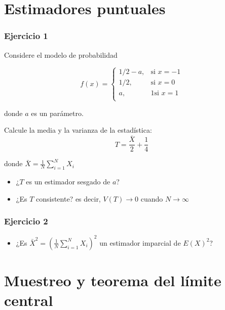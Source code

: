 \documentclass[
]{book}
\providecommand{\tightlist}{%
  \setlength{\itemsep}{0pt}\setlength{\parskip}{0pt}}
\begin{document}
\hypertarget{estimadores-puntuales}{%
\section{Estimadores puntuales}\label{estimadores-puntuales}}

\hypertarget{ejercicio-1-5}{%
\subsubsection{Ejercicio 1}\label{ejercicio-1-5}}

Considere el modelo de probabilidad

\[
    f(x)= 
\begin{cases}
    1/2-a,& \text{si } x=-1 \\ 
    1/2,& \text{si } x=0\\
    a,& 1 \text{si } x=1\\ 
\end{cases}
\]

donde \(a\) es un parámetro.

Calcule la media y la varianza de la estadística: \[T=\frac{\bar{X}}{2}+\frac{1}{4}\]

donde \(\bar{X}=\frac{1}{N}\sum_{i=1}^N X_i\)

\begin{itemize}
\item
  ¿\(T\) es un estimador sesgado de \(a\)?
\item
  ¿Es \(T\) consistente? es decir, \(V(T) \rightarrow 0\) cuando \(N\rightarrow \infty\)
\end{itemize}

\hypertarget{ejercicio-2-5}{%
\subsubsection{Ejercicio 2}\label{ejercicio-2-5}}

\begin{itemize}
\tightlist
\item
  ¿Es \(\bar{X}^2=(\frac{1}{N}\sum_{i=1}^N X_i)^2\) un estimador imparcial de \(E(X)^2\)?
\end{itemize}

\hypertarget{muestreo-y-teorema-del-luxedmite-central}{%
\section{Muestreo y teorema del límite central}\label{muestreo-y-teorema-del-luxedmite-central}}
\end{document}
